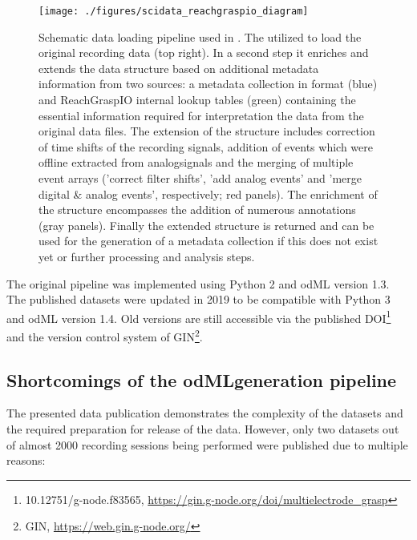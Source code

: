\begin{figure}
 \texttt{[image: ./figures/scidata\_reachgraspio\_diagram]}
 \caption[Schematic data loading pipeline used in \citet{Brochier_2018}]{Schematic data loading pipeline used in \citet{Brochier_2018}. The  utilized  to load the original recording data (top right). In a second step it enriches and extends the data structure based on additional metadata information from two sources: a metadata collection in  format (blue) and ReachGraspIO internal lookup tables (green) containing the essential information required for interpretation the data from the original data files. The extension of the  structure includes correction of time shifts of the recording signals, addition of events which were offline extracted from analogsignals and the merging of multiple event arrays ('correct filter shifts', 'add analog events' and 'merge digital \& analog events', respectively; red panels). The enrichment of the  structure encompasses the addition of numerous annotations (gray panels). Finally the extended  structure is returned and can be used for the generation of a metadata collection if this does not exist yet or further processing and analysis steps.}
 \label{fig:scidata_reachgraspio_diagram}
\end{figure}




The original pipeline was implemented using Python 2 and odML version 1.3. The published datasets were updated in 2019 to be compatible with Python 3 and odML version 1.4. Old versions are still accessible via the published DOI\footnote{10.12751/g-node.f83565, \url{https://gin.g-node.org/doi/multielectrode_grasp}} and the version control system of GIN\footnote{GIN, \url{https://web.gin.g-node.org/}}.

\subsection{Shortcomings of the odMLgeneration pipeline}
\label{sec:scidata_shortcomings}
The presented data publication demonstrates the complexity of the datasets and the required preparation for release of the data. However, only two datasets out of almost 2000 recording sessions being performed were published due to multiple reasons:

